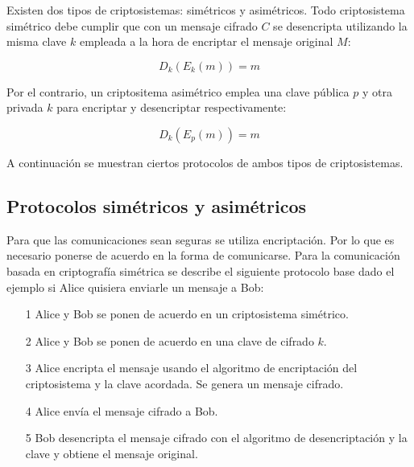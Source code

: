 \documentclass[../PFC.tex]{subfiles}
\begin{document}
Existen dos tipos de criptosistemas: simétricos y asimétricos. Todo criptosistema simétrico debe cumplir que con un mensaje cifrado $C$ se desencripta utilizando la misma clave $k$ empleada a la hora de encriptar el mensaje original $M$:

\begin{center}
\begin{equation}
D_{k}(E_{k}(m)) = m
\end{equation}
\end{center}

Por el contrario, un criptositema asimétrico emplea una clave pública $p$ y otra privada $k$ para encriptar y desencriptar respectivamente:

\begin{center}
\begin{equation}
D_{k}(E_{p}(m)) = m
\end{equation}
\end{center}

A continuación se muestran ciertos protocolos de ambos tipos de criptosistemas.

\subsection{Protocolos simétricos y asimétricos}
\label{Protocolos simétricos y asimétricos}

Para que las comunicaciones sean seguras se utiliza encriptación. Por lo que es necesario ponerse de acuerdo en la forma de comunicarse. Para la comunicación basada en criptografía simétrica se describe el siguiente protocolo base dado el ejemplo si Alice quisiera enviarle un mensaje a Bob\cite{bruce}:

\begin{itemize}
\item[1]{Alice y Bob se ponen de acuerdo en un criptosistema simétrico.}
\item[2]{Alice y Bob se ponen de acuerdo en una clave de cifrado $k$.}
\item[3]{Alice encripta el mensaje usando el algoritmo de encriptación del criptosistema y la clave acordada. Se genera un mensaje cifrado.}
\item[4]{Alice envía el mensaje cifrado a Bob.}
\item[5]{Bob desencripta el mensaje cifrado con el algoritmo de desencriptación y la clave y obtiene el mensaje original.}
\end{itemize}
\end{document}
